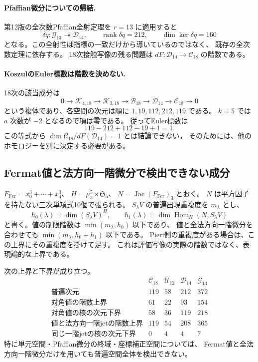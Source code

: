 \paragraph{Pfaffian微分についての帰結.}
第12版の全次数Pfaffian全射定理を $r=13$ に適用すると
\[
 \delta q:\mathcal G_{13}\twoheadrightarrow\mathcal D_{14},
 \qquad\operatorname{rank}\delta q=212,\qquad
 \dim\ker\delta q=160
\]
となる。この全射性は指標の一致だけから導いているのではなく、
既存の全次数定理に依存する。
18次接触写像の残る問題は $dF:\mathcal D_{14}\to\mathcal C_{18}$ の階数である。

\paragraph{KoszulのEuler標数は階数を決めない.}
18次の該当成分は
\[
 0\longrightarrow\mathcal K_{4,18}
 \longrightarrow\mathcal K_{3,18}
 \longrightarrow\mathcal B_{18}
 \longrightarrow\mathcal D_{14}
 \longrightarrow\mathcal C_{18}\longrightarrow0
\]
という複体であり、各空間の次元は順に $1,19,112,212,119$ である。
$k=5$ では $a$ 次数が $-2$ となるので項は零である。
従ってEuler標数は
\[
 119-212+112-19+1=1.
\]
この等式から $\dim\mathcal C_{18}/dF(\mathcal D_{14})=1$ とは結論できない。
そのためには、他のホモロジーを別に決定する必要がある。

\subsection{Fermat値と法方向一階微分で検出できない成分}

$F_{\mathrm{Fer}}=x_0^3+\cdots+x_4^3$、
$H=\mu_3^5\rtimes\mathfrak S_5$、
$N=\operatorname{Jac}(F_{\mathrm{Fer}})_3$ とおく。
$N$ は平方因子を持たない三次単項式10個で張られる。
$S_\lambda V$ の普遍出現重複度を $m_\lambda$ とし、
\[
 h_0(\lambda)=\dim(S_\lambda V)^H,\qquad
 h_1(\lambda)=\dim\operatorname{Hom}_H(N,S_\lambda V)
\]
と書く。値の制限階数は $\min(m_\lambda,h_0)$ 以下であり、
値と全法方向一階微分を合わせても $\min(m_\lambda,h_0+h_1)$ 以下である。
Pieri側の重複度がある場合は、この上界にその重複度を掛けて足す。
これは評価写像の実際の階数ではなく、表現論的な上界である。

\begin{proposition}[18次の対角制限と一階jetの上界]
\label{prop:v14-eighteenth-visibility}
次の上界と下界が成り立つ。
\[
\begin{array}{c|rrrr}
&\mathcal C_{18}&\mathcal U_{12}&\mathcal D_{14}&\mathcal G_{13}\\\hline
\text{普遍次元}&119&58&212&372\\
\text{対角値の階数上界}&61&22&93&154\\
\text{対角値の核の次元下界}&58&36&119&218\\
\text{値と法方向一階jetの階数上界}&119&54&208&365\\
\text{同じ一階jetの核の次元下界}&0&4&4&7
\end{array}
\]
特に単元空間・Pfaffian微分の終域・座標補正空間については、
Fermat値と全法方向一階微分だけを用いても普遍空間全体を検出できない。
\end{proposition}

